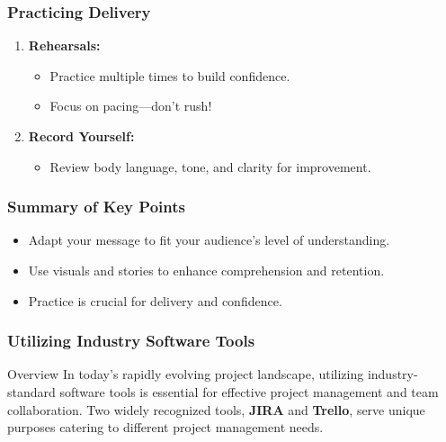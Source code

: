 \documentclass[aspectratio=169]{beamer}
\begin{document}
\begin{frame}[fragile]
    \frametitle{Practicing Delivery}
    \begin{enumerate}
        \item \textbf{Rehearsals:}
        \begin{itemize}
            \item Practice multiple times to build confidence.
            \item Focus on pacing—don’t rush!
        \end{itemize}
        
        \item \textbf{Record Yourself:}
        \begin{itemize}
            \item Review body language, tone, and clarity for improvement.
        \end{itemize}
    \end{enumerate}
\end{frame}

\begin{frame}[fragile]
    \frametitle{Summary of Key Points}
    \begin{itemize}
        \item Adapt your message to fit your audience’s level of understanding.
        \item Use visuals and stories to enhance comprehension and retention.
        \item Practice is crucial for delivery and confidence.
    \end{itemize}
\end{frame}

\begin{frame}[fragile]
    \frametitle{Utilizing Industry Software Tools}
    \begin{block}{Overview}
        In today's rapidly evolving project landscape, utilizing industry-standard software tools is essential for effective project management and team collaboration. 
        Two widely recognized tools, \textbf{JIRA} and \textbf{Trello}, serve unique purposes catering to different project management needs.
    \end{block}
\end{frame}
\end{document}
